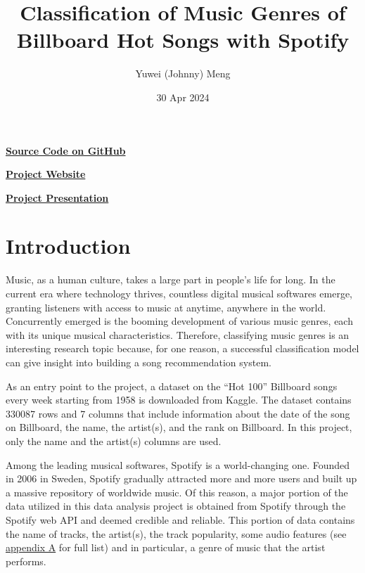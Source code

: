 \documentclass{article}
\title{Classification of Music Genres of Billboard Hot Songs with Spotify}
\author{Yuwei (Johnny) Meng}
\date{30 Apr 2024}
\begin{document}
\pagestyle{fancy}

\maketitle

\href{https://github.com/BullDF/billboard-songs-analysis-with-spotify/tree/main}{\textbf{Source Code on GitHub}}

\href{https://bulldf.github.io/billboard-songs-analysis-with-spotify/}{\textbf{Project Website}}

\href{https://play.library.utoronto.ca/watch/c4d71902f00f5e6fe91bea00974fce6c}{\textbf{Project Presentation}}

\section{Introduction}

Music, as a human culture, takes a large part in people's life for long. In the current era where technology thrives, countless digital musical softwares emerge, granting listeners with access to music at anytime, anywhere in the world. Concurrently emerged is the booming development of various music genres, each with its unique musical characteristics. Therefore, classifying music genres is an interesting research topic because, for one reason, a successful classification model can give insight into building a song recommendation system.

As an entry point to the project, a dataset on the ``Hot 100'' Billboard songs every week starting from 1958 is downloaded from Kaggle. The dataset contains 330087 rows and 7 columns that include information about the date of the song on Billboard, the name, the artist(s), and the rank on Billboard. In this project, only the name and the artist(s) columns are used.

Among the leading musical softwares, Spotify is a world-changing one. Founded in 2006 in Sweden, Spotify gradually attracted more and more users and built up a massive repository of worldwide music. Of this reason, a major portion of the data utilized in this data analysis project is obtained from Spotify through the Spotify web API and deemed credible and reliable. This portion of data contains the name of tracks, the artist(s), the track popularity, some audio features (see \hyperref[sec:audio_features]{appendix A} for full list) and in particular, a genre of music that the artist performs.
\end{document}
